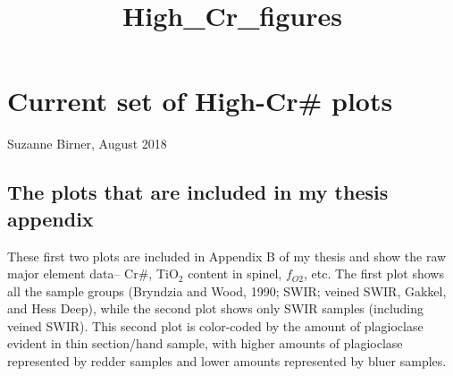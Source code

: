 \documentclass[11pt]{article}
\title{High\_Cr\_figures}
\begin{document}
    
    
    \maketitle
    
    

    
    \hypertarget{current-set-of-high-cr-plots}{%
\section{Current set of High-Cr\#
plots}\label{current-set-of-high-cr-plots}}

    Suzanne Birner, August 2018

    \hypertarget{the-plots-that-are-included-in-my-thesis-appendix}{%
\subsection{The plots that are included in my thesis
appendix}\label{the-plots-that-are-included-in-my-thesis-appendix}}

    These first two plots are included in Appendix B of my thesis and show
the raw major element data-- Cr\#, TiO\(_2\) content in spinel,
\(f_{O2}\), etc. The first plot shows all the sample groups (Bryndzia
and Wood, 1990; SWIR; veined SWIR, Gakkel, and Hess Deep), while the
second plot shows only SWIR samples (including veined SWIR). This second
plot is color-coded by the amount of plagioclase evident in thin
section/hand sample, with higher amounts of plagioclase represented by
redder samples and lower amounts represented by bluer samples.
\end{document}
